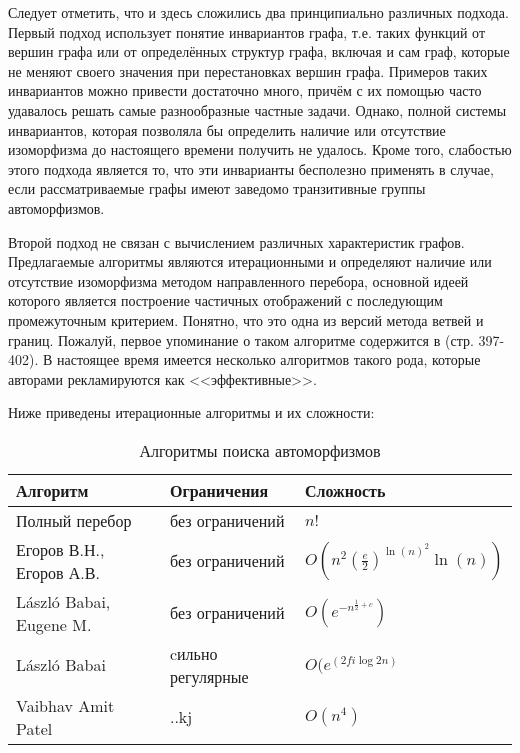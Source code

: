 Следует отметить, что и здесь сложились два принципиально различных подхода. Первый подход использует понятие инвариантов графа, т.е. таких функций от вершин графа или от определённых структур графа, включая и сам граф, которые не меняют своего значения при перестановках вершин графа. Примеров таких инвариантов можно привести достаточно много, причём с их помощью часто удавалось решать самые разнообразные частные задачи. Однако, полной системы инвариантов, которая позволяла бы определить наличие или отсутствие изоморфизма до настоящего времени получить не удалось. Кроме того, слабостью этого подхода является то, что эти инварианты бесполезно применять в случае, если рассматриваемые графы имеют заведомо транзитивные группы автоморфизмов.

Второй подход не связан с вычислением различных характеристик графов. Предлагаемые алгоритмы являются итерационными и определяют наличие или отсутствие изоморфизма методом направленного перебора, основной идеей которого является построение частичных отображений с последующим промежуточным критерием. Понятно, что это одна из версий метода ветвей и границ. Пожалуй, первое упоминание о таком алгоритме содержится в \cite{Book_Reingold} (стр. 397-402). В настоящее время имеется несколько алгоритмов такого рода, которые авторами рекламируются как <<эффективные>>.

Ниже приведены итерационные алгоритмы и их сложности:

\begin{table}[h]
\centering
\begin{tabular}[t]{|l|l|l|}
\hline
\textbf{Алгоритм} & \textbf{Ограничения} & \textbf{Сложность}\\
\hline
Полный перебор & без ограничений & $n!$\\
\hline
Егоров В.Н., Егоров А.В. & без ограничений & $O(n^2(\frac{e}{2})^{\ln(n)^2} \ln(n))$\\
\hline
László Babai, Eugene M. & без ограничений & $O(e^{-n^{\frac{1}{2} + c}})$\\
\hline
László Babai & cильно регулярные & $O(e^(2fi \log2 n)$\\
\hline
Vaibhav Amit Patel & ..kj & $O(n^4)$\\
\hline
\end{tabular}
\caption{Алгоритмы поиска автоморфизмов}
\label{tabular:algos}
\end{table}
